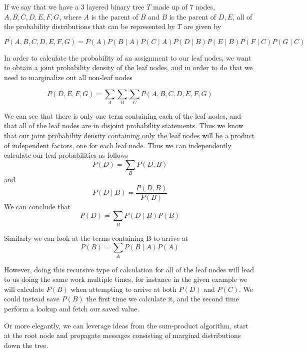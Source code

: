 \documentclass[11pt,a4paper]{article}
\begin{document}
If we say that we have a 3 layered binary tree $T$ made up of 7 nodes, $A, B, C, D, E,F,G$, where $A$ is the parent of $ B $ and $ B $ is the parent of $ D, E $, all of the probability distributions that can be represented by $T$ are given by

$$ P(A, B, C,D,E,F,G) = P(A)P(B \mid A)P(C \mid A)P(D \mid B)P(E \mid B)P(F \mid C)P(G \mid C) $$

In order to calculate the probability of an assignment to our leaf nodes, we want to obtain a joint probability density of the leaf nodes, and in order to do that we need to marginalize out all non-leaf nodes

$$ P(D, E, F,G) = \sum_{A} \sum_{B} \sum_{C} P(A, B, C,D,E,F,G) $$

We can see that there is only one term containing each of the leaf nodes, and that all of the leaf nodes are in disjoint probability statements. Thus we know that our joint probability density containing only the leaf nodes will be a product of independent factors, one for each leaf node. Thus we can independently calculate our leaf probabilities as follows
 $$ P(D) = \sum_{B} P(D, B) $$
 and
 $$ P(D \mid B) = \frac{P(D, B)}{P(B)} $$
 We can conclude that
 $$P(D) = \sum_{B} P(D \mid B)P(B) $$
 
Similarly we can look at the terms containing B to arrive at
$$P(B) = \sum_{A} P(B \mid A)P(A) $$

However, doing this recursive type of calculation for all of the leaf nodes will lead to us doing the same work multiple times, for instance in the given example we will calculate $P(B)$ when attempting to arrive at both $P(D)$ and $P(C)$. We could instead save $P(B)$ the first time we calculate it, and the second time perform a lookup and fetch our saved value. 

Or more elegantly, we can leverage ideas from the sum-product algorithm, start at the root node and propagate messages consisting of marginal distributions down the tree.
\end{document}
